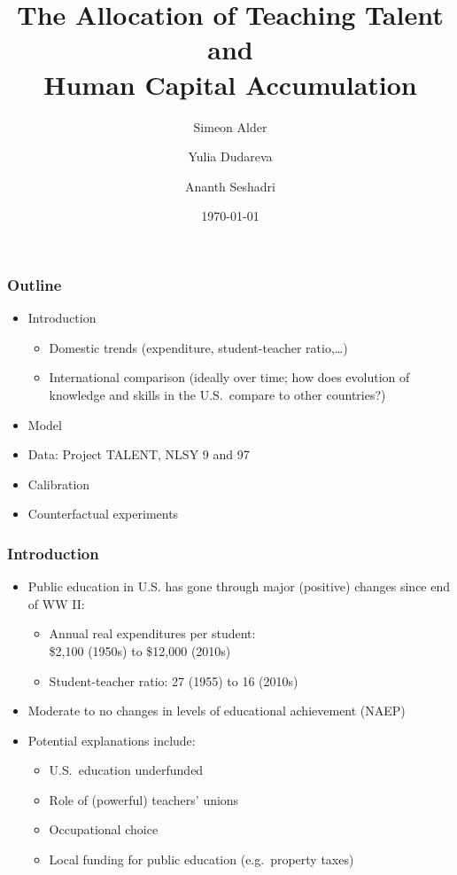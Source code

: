 \documentclass[11pt]{beamer}
\title{The Allocation of Teaching Talent and \\Human Capital Accumulation}
\author[shortname]{Simeon Alder\inst{1} \and Yulia Dudareva\inst{2} \and Ananth Seshadri\inst{1}}
\institute[shortinst]{\inst{1} University of Wisconsin--Madison \and \inst{2} Copenhagen Business School}
\date{\today}
\begin{document}
	
	\begin{frame}
		\titlepage
	\end{frame}
	
	\begin{frame}
	\frametitle{Outline}
	\begin{itemize}
  \item Introduction
  \begin{itemize}
  \item Domestic trends (expenditure, student-teacher ratio,\ldots)
  \item International comparison (ideally over time; how does evolution of knowledge and skills in the U.S.~compare to other countries?)
\end{itemize}
  \item Model
  \item Data: Project TALENT, NLSY 9 and 97
  \item Calibration
  \item Counterfactual experiments
\end{itemize}
	\end{frame}
	
	\begin{frame}
		\frametitle{Introduction}
		\vfill
		\begin{itemize}
			\item Public education in U.S. has gone through major (positive) changes since end of WW II:
			\begin{itemize}
				\item[$\circ$] Annual real expenditures per student: \\
				\$2,100 (1950s) to \$12,000 (2010s)
				\item[$\circ$] Student-teacher ratio: 27 (1955) to 16 (2010s)
			\end{itemize}
			\vfill
			\item Moderate to no changes in levels of educational
                achievement (NAEP) 
			\vfill
			\item Potential explanations include:
			\begin{itemize}
				\item[$\circ$] U.S.~education underfunded %
				\item[$\circ$] Role of (powerful) teachers' unions \pause
				\item[$\circ$] \alert{Occupational choice} \pause
				\item[$\circ$] Local funding for public education (e.g.~property taxes)
			\end{itemize}
		\end{itemize}
		\vfill
	\end{frame}
	
\end{document}
